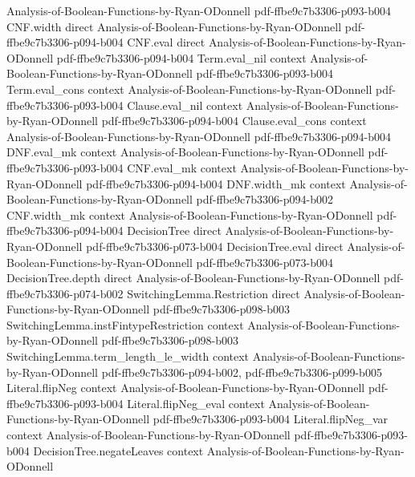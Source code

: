 \begin{lemma}
  {Analysis-of-Boolean-Functions-by-Ryan-ODonnell}
  {pdf-ffbe9c7b3306-p093-b004}
\proofstep
  {CNF.width}
  {direct}
  {Analysis-of-Boolean-Functions-by-Ryan-ODonnell}
  {pdf-ffbe9c7b3306-p094-b004}
\proofstep
  {CNF.eval}
  {direct}
  {Analysis-of-Boolean-Functions-by-Ryan-ODonnell}
  {pdf-ffbe9c7b3306-p094-b004}
\proofstep
  {Term.eval_nil}
  {context}
  {Analysis-of-Boolean-Functions-by-Ryan-ODonnell}
  {pdf-ffbe9c7b3306-p093-b004}
\proofstep
  {Term.eval_cons}
  {context}
  {Analysis-of-Boolean-Functions-by-Ryan-ODonnell}
  {pdf-ffbe9c7b3306-p093-b004}
\proofstep
  {Clause.eval_nil}
  {context}
  {Analysis-of-Boolean-Functions-by-Ryan-ODonnell}
  {pdf-ffbe9c7b3306-p094-b004}
\proofstep
  {Clause.eval_cons}
  {context}
  {Analysis-of-Boolean-Functions-by-Ryan-ODonnell}
  {pdf-ffbe9c7b3306-p094-b004}
\proofstep
  {DNF.eval_mk}
  {context}
  {Analysis-of-Boolean-Functions-by-Ryan-ODonnell}
  {pdf-ffbe9c7b3306-p093-b004}
\proofstep
  {CNF.eval_mk}
  {context}
  {Analysis-of-Boolean-Functions-by-Ryan-ODonnell}
  {pdf-ffbe9c7b3306-p094-b004}
\proofstep
  {DNF.width_mk}
  {context}
  {Analysis-of-Boolean-Functions-by-Ryan-ODonnell}
  {pdf-ffbe9c7b3306-p094-b002}
\proofstep
  {CNF.width_mk}
  {context}
  {Analysis-of-Boolean-Functions-by-Ryan-ODonnell}
  {pdf-ffbe9c7b3306-p094-b004}
\proofstep
  {DecisionTree}
  {direct}
  {Analysis-of-Boolean-Functions-by-Ryan-ODonnell}
  {pdf-ffbe9c7b3306-p073-b004}
\proofstep
  {DecisionTree.eval}
  {direct}
  {Analysis-of-Boolean-Functions-by-Ryan-ODonnell}
  {pdf-ffbe9c7b3306-p073-b004}
\proofstep
  {DecisionTree.depth}
  {direct}
  {Analysis-of-Boolean-Functions-by-Ryan-ODonnell}
  {pdf-ffbe9c7b3306-p074-b002}
\proofstep
  {SwitchingLemma.Restriction}
  {direct}
  {Analysis-of-Boolean-Functions-by-Ryan-ODonnell}
  {pdf-ffbe9c7b3306-p098-b003}
\proofstep
  {SwitchingLemma.instFintypeRestriction}
  {context}
  {Analysis-of-Boolean-Functions-by-Ryan-ODonnell}
  {pdf-ffbe9c7b3306-p098-b003}
\proofstep
  {SwitchingLemma.term_length_le_width}
  {context}
  {Analysis-of-Boolean-Functions-by-Ryan-ODonnell}
  {pdf-ffbe9c7b3306-p094-b002,
    pdf-ffbe9c7b3306-p099-b005}
\proofstep
  {Literal.flipNeg}
  {context}
  {Analysis-of-Boolean-Functions-by-Ryan-ODonnell}
  {pdf-ffbe9c7b3306-p093-b004}
\proofstep
  {Literal.flipNeg_eval}
  {context}
  {Analysis-of-Boolean-Functions-by-Ryan-ODonnell}
  {pdf-ffbe9c7b3306-p093-b004}
\proofstep
  {Literal.flipNeg_var}
  {context}
  {Analysis-of-Boolean-Functions-by-Ryan-ODonnell}
  {pdf-ffbe9c7b3306-p093-b004}
\proofstep
  {DecisionTree.negateLeaves}
  {context}
  {Analysis-of-Boolean-Functions-by-Ryan-ODonnell}

\end{lemma}
